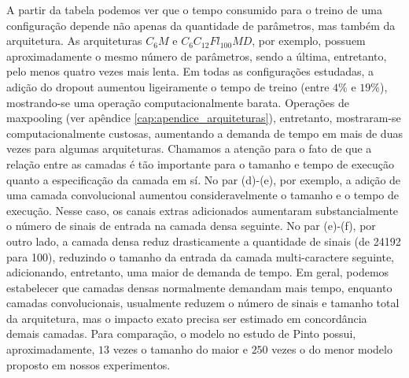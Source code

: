 A partir da tabela podemos ver que o tempo consumido para o treino de uma configuração depende não apenas da quantidade de parâmetros, mas também da arquitetura. As arquiteturas $C_6M$ e $C_6C_{12}Fl_{100}MD$, por exemplo, possuem aproximadamente o mesmo número de parâmetros, sendo a última, entretanto, pelo menos quatro vezes mais lenta. Em todas as configurações estudadas, a adição do dropout aumentou ligeiramente o tempo de treino (entre $4\%$ e $19\%$), mostrando-se uma operação computacionalmente barata. Operações de maxpooling (ver apêndice \ref{cap:apendice_arquiteturas}), entretanto, mostraram-se computacionalmente custosas, aumentando a demanda de tempo em mais de duas vezes para algumas arquiteturas. Chamamos a atenção para o fato de que a relação entre as camadas é tão importante para o tamanho e tempo de execução quanto a especificação da camada em sí. No par (d)-(e), por exemplo, a adição de uma camada convolucional aumentou consideravelmente o tamanho e o tempo de execução. Nesse caso, os canais extras adicionados aumentaram substancialmente o número de sinais de entrada na camada densa seguinte. No par (e)-(f), por outro lado, a camada densa reduz drasticamente a quantidade de sinais (de 24192 para 100), reduzindo o tamanho da entrada da camada multi-caractere seguinte, adicionando, entretanto, uma maior de demanda de tempo. Em geral, podemos estabelecer que camadas densas normalmente demandam mais tempo, enquanto camadas convolucionais, usualmente reduzem o número de sinais e tamanho total da arquitetura, mas o impacto exato precisa ser estimado em concordância demais camadas. Para comparação, o modelo no estudo de Pinto possui, aproximadamente, $13$ vezes o tamanho do maior e $250$ vezes o do menor modelo proposto em nossos experimentos.

